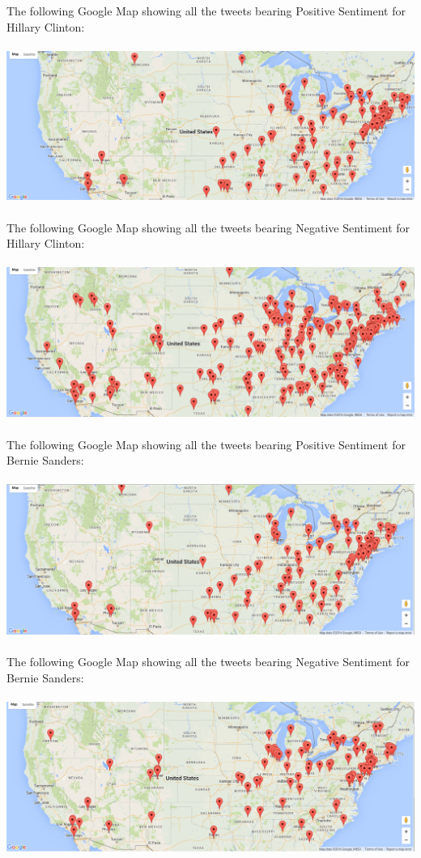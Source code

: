 \documentclass[twoside]{article}
\begin{document}
\begin{multicols}{2}
The following Google Map showing all the tweets bearing Positive Sentiment for Hillary Clinton: \\ \\
\includegraphics[width=0.95\columnwidth]{clinton-pos} \\ \\
The following Google Map showing all the tweets bearing Negative Sentiment for Hillary Clinton: \\ \\
\includegraphics[width=0.95\columnwidth]{clinton-neg} \\ \\
The following Google Map showing all the tweets bearing Positive Sentiment for Bernie Sanders: \\ \\
\includegraphics[width=0.95\columnwidth]{sanders-pos} \\ \\
The following Google Map showing all the tweets bearing Negative Sentiment for Bernie Sanders: \\ \\
\includegraphics[width=0.95\columnwidth]{sanders-neg} \\ \\

\end{multicols}
\end{document}
